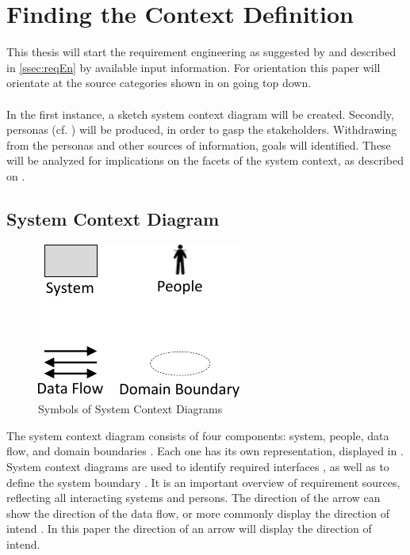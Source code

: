 \section{Finding the Context Definition}
This thesis will start the requirement engineering as suggested by \textcite[55]{Pohl.2007} and described in \cref{ssec:reqEn} by available input information. For orientation this paper will orientate at the source categories shown in  on  going top down. 

\paragraph{} In the first instance, a sketch system context diagram will be created. Secondly, personas (cf. ) will be produced, in order to gasp the stakeholders. Withdrawing from the personas and other sources of information, goals will identified. These will be analyzed for implications on the facets of the system context, as described on .


\subsection{System Context Diagram}
\begin{figure}[H]
    \centering
    \includegraphics[scale=1]{img/SCDSymbols.pdf}
    \caption[Symbols of System Context Diagrams]{Symbols of System Context Diagrams \parencites[77]{Lauesen.2008}}
    \label{fig:scdSym}
\end{figure}
The system context diagram consists of four components: system, people, data flow, and domain boundaries \parencites[cf.][76-77]{Lauesen.2008}. Each one has its own representation, displayed in . System context diagrams are used to identify required interfaces \parencites[cf.][75]{Lauesen.2008}, as well as to define the system boundary \parencites[cf.][75]{Ebert.2014}. It is an important overview of requirement sources, reflecting all interacting systems and persons. The direction of the arrow can show the direction of the data flow, or more commonly display the direction of intend \parencite[cf.][77]{Lauesen.2008}. In this paper the direction of an arrow will display the direction of intend.

